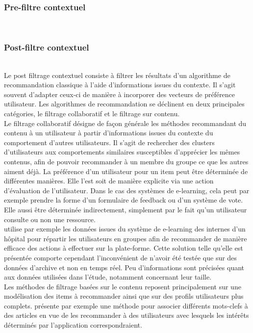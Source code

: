 \documentclass[conference]{./sty/IEEEtran}
\begin{document}
\subsubsection{Pre-filtre contextuel}
~\\

\subsubsection{Post-filtre contextuel}
~\\
Le post filtrage contextuel consiste à filtrer les résultats d'un algorithme
de recommandation classique à l'aide d'informations issues du
contexte\cite{DBLP:journals/tlt/VerbertMOWDBD12}. Il s'agit souvent d'adapter
ceux-ci de manière à incorporer des vecteurs de préférence utilisateur. Les
algorithmes de recommandation se déclinent en deux principales catégories, le
filtrage collaboratif et le filtrage sur contenu. \\

Le filtrage collaboratif désigne de façon générale les méthodes recommandant du
contenu à un utilisateur à partir d'informations issues du contexte du
comportement d'autres utilisateurs. Il s'agit de rechercher des clusters
d'utilisateurs aux comportements similaires susceptibles d'apprécier les mêmes
contenus, afin de pouvoir recommander à un membre du groupe ce que les autres
aiment déjà. La préférence d'un utilisateur pour un item peut être déterminée
de différentes manières. Elle l'est soit de manière explicite via une action 
d'évaluation de l'utilisateur. Dans le cas des systèmes de e-learning, cela
peut par exemple prendre la forme d'un formulaire de feedback ou d'un système
de vote. Elle aussi être déterminée indirectement, simplement par le fait qu'un
utilisateur consulte ou non une ressource. \\
\cite{Liou:2014:CPL:2617848.2617854} utilise par exemple les données issues du
système de  e-learning des internes d'un hôpital pour répartir les utilisateurs
en groupes afin de recommander de manière efficace des actions à effectuer sur
la plate-forme. Cette solution telle qu'elle est présentée comporte cependant
l'inconvénient de n'avoir été testée que sur des données d'archive et non en
temps réel. Peu d'informations sont précisées quant aux données utilisées dans
l'étude, notamment concernant leur taille.  \\

Les méthodes de filtrage basées sur le contenu reposent principalement sur
une modélisation des items à recommander ainsi que sur des profils utilisateurs
plus complets. \cite{DBLP:journals/jucs/SternKHKL10} présente par exemple une
méthode pour associer différents mots-clefs à des articles en vue de les
recommander à des utilisateurs avec lesquels les intérêts déterminés par
l'application correspondraient. \\
\end{document}
